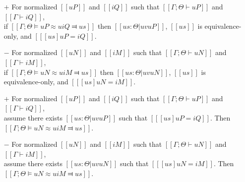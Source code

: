 \begin{lemma} \label{lemma:unification-soundness}
    \hfill
    \begin{itemize}
        \item [$+$] For normalized $[[uP]]$ and $[[iQ]]$ such that 
        $[[Γ ; Θ ⊢ uP]]$ and $[[Γ ⊢ iQ]]$,\\ 
        if $[[Γ ; Θ ⊨ uP ≈u iQ ⫤ us]]$ then $[[us : Θ | uv uP]]$, 
        $[[us]]$ is equivalence-only, and $[[ [us]uP = iQ ]]$.

        \item [$-$] For normalized $[[uN]]$ and $[[iM]]$ such that
        $[[Γ ; Θ ⊢ uN]]$ and $[[Γ ⊢ iM]]$,\\
        if $[[Γ ; Θ ⊨ uN ≈u iM ⫤ us]]$ then $[[us : Θ | uv uN]]$,
        $[[us]]$ is equivalence-only, and $[[ [us]uN = iM ]]$.
    \end{itemize}
\end{lemma}

\begin{lemma} \label{lemma:unification-completeness}
    \hfill
    \begin{itemize}
        \item [$+$] For normalized $[[uP]]$ and $[[iQ]]$ such that
        $[[Γ ; Θ ⊢ uP]]$ and $[[Γ ⊢ iQ]]$,\\ 
        assume there exists 
        $[[us : Θ | uv uP]]$ such that $[[ [us]uP = iQ ]]$.
        Then $[[Γ ; Θ ⊨ uN ≈u iM ⫤ us]]$.
        
        \item [$-$] For normalized $[[uN]]$ and $[[iM]]$ such that
        $[[Γ ; Θ ⊢ uN]]$ and $[[Γ ⊢ iM]]$,\\
        assume there exists $[[us : Θ | uv uN]]$        
        such that $[[ [us]uN = iM ]]$.
        Then $[[Γ ; Θ ⊨ uN ≈u iM ⫤ us]]$.
   \end{itemize}
\end{lemma}